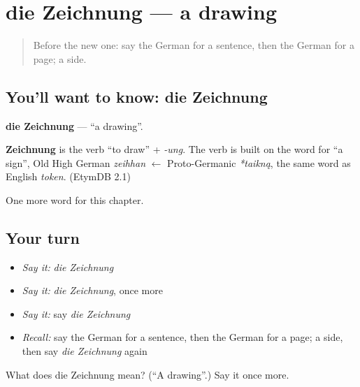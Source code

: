 \section[die Zeichnung]{die Zeichnung — a drawing}

\label{lesson:GE-C128-zeichnung}



\begin{quote}
Before the new one: say the German for a sentence, then the German for a page; a side.
\end{quote}

\subsection*{You'll want to know: die Zeichnung}
\textbf{die Zeichnung} — \textquotedblleft{}a drawing\textquotedblright{}.

\begin{cousinweb}
\textbf{Zeichnung} is the verb \textquotedblleft{}to draw\textquotedblright{} + \emph{-ung}. The verb is built on the word for \textquotedblleft{}a sign\textquotedblright{}, Old High German \emph{zeihhan} $\leftarrow$ Proto-Germanic \emph{*taikną}, the same word as English \emph{token}. (EtymDB 2.1)
\end{cousinweb}

\begin{grammarlens}[title={What you've built}]
One more word for this chapter.
\end{grammarlens}

\subsection*{Your turn}
\begin{itemize}
\raggedright
  \item \emph{Say it:} \emph{die Zeichnung}
  \item \emph{Say it:} \emph{die Zeichnung}, once more
  \item \emph{Say it:} say \emph{die Zeichnung}
  \item \emph{Recall:} say the German for a sentence, then the German for a page; a side, then say \emph{die Zeichnung} again
\end{itemize}

\begin{tcolorbox}[breakable,colback=teal!4,colframe=teal!35!black,title={Before you move on}]
What does die Zeichnung mean? (\textquotedblleft{}A drawing\textquotedblright{}.) Say it once more.
\end{tcolorbox}

